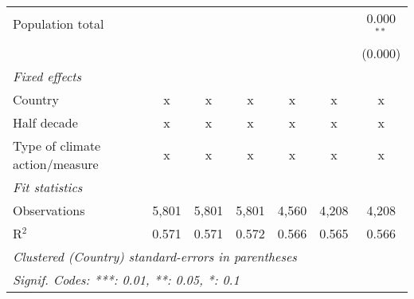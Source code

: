 \begin{tabular}{lcccccc}
   Population total                                               &              &               &                &                &                & 0.000$^{**}$\\   
                                                                  &              &               &                &                &                & (0.000)\\   
   \emph{Fixed effects}\\
   Country                                                        & x            & x             & x              & x              & x              & x\\  
   Half decade                                                    & x            & x             & x              & x              & x              & x\\  
   Type of climate action/measure                                 & x            & x             & x              & x              & x              & x\\  
   \midrule \emph{Fit statistics}\\
   Observations                                                   & 5,801        & 5,801         & 5,801          & 4,560          & 4,208          & 4,208\\  
   R$^2$                                                          & 0.571        & 0.571         & 0.572          & 0.566          & 0.565          & 0.566\\  
   \midrule
   \multicolumn{7}{l}{\emph{Clustered (Country) standard-errors in parentheses}}\\
   \multicolumn{7}{l}{\emph{Signif. Codes: ***: 0.01, **: 0.05, *: 0.1}}\\
\end{tabular}
\par\endgroup


